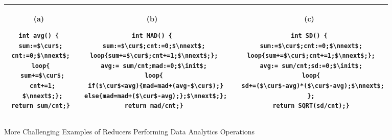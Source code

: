 \vspace{-1cm}
\begin{figure}
	\centering
	\lstset{language=C,
		basicstyle=\ttfamily\scriptsize}
	\begin{tabular}{|c|c|c|}
		\hline
		\begin{minipage}[t]{0.2\textwidth}
			(a)
			\begin{lstlisting}[mathescape=true]
int avg() {
 sum:=$\cur$;
 cnt:=0;$\nnext$;
 loop{
  sum+=$\cur$;
  cnt+=1;
  $\nnext$;};
 return sum/cnt;}
			\end{lstlisting}
		\end{minipage}&
		\begin{minipage}[t]{0.4\textwidth}
			(b)
\begin{lstlisting}[mathescape=true]
int MAD() {
 sum:=$\cur$;cnt:=0;$\nnext$;
 loop{sum+=$\cur$;cnt+=1;$\nnext$;};
 avg:= sum/cnt;mad:=0;$\init$;
 loop{
  if($\cur$<avg){mad=mad+(avg-$\cur$);}
  else{mad=mad+($\cur$-avg);};$\nnext$;};
 return mad/cnt;}
\end{lstlisting}
		\end{minipage}&
		\begin{minipage}[t]{0.4\textwidth}
			(c)
			\begin{lstlisting}[mathescape=true]
int SD() {
 sum:=$\cur$;cnt:=0;$\nnext$;
 loop{sum+=$\cur$;cnt+=1;$\nnext$;};
 avg:= sum/cnt;sd:=0;$\init$;
 loop{
  sd+=($\cur$-avg)*($\cur$-avg);$\nnext$;
 };
 return SQRT(sd/cnt);}
			\end{lstlisting}
		\end{minipage}\\
		\hline		
	\end{tabular}
	\caption{More Challenging Examples of Reducers Performing Data Analytics Operations}
	\label{fig:examples2}
\end{figure}
\vspace{-0.5cm}